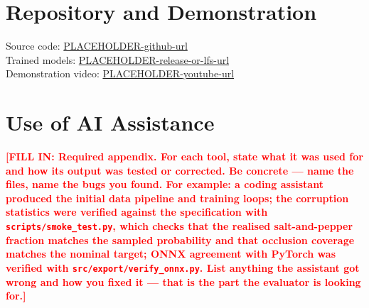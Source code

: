 \documentclass[conference]{IEEEtran}
\newcommand{\PLACEHOLDER}[1]{\textcolor{red}{\textbf{[FILL IN: #1]}}}
\begin{document}
\appendices
\section{Repository and Demonstration}
Source code: \url{PLACEHOLDER-github-url}\\
Trained models: \url{PLACEHOLDER-release-or-lfs-url}\\
Demonstration video: \url{PLACEHOLDER-youtube-url}

\section{Use of AI Assistance}
\PLACEHOLDER{Required appendix. For each tool, state what it was used for and
how its output was tested or corrected. Be concrete --- name the files, name the
bugs you found. For example: a coding assistant produced the initial data
pipeline and training loops; the corruption statistics were verified against the
specification with \texttt{scripts/smoke\_test.py}, which checks that the
realised salt-and-pepper fraction matches the sampled probability and that
occlusion coverage matches the nominal target; ONNX agreement with PyTorch was
verified with \texttt{src/export/verify\_onnx.py}. List anything the assistant
got wrong and how you fixed it --- that is the part the evaluator is looking
for.}
\end{document}
